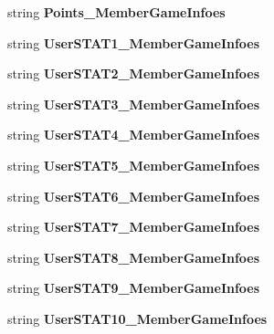 \begin{DoxyCompactItemize}
\item 
string {\bfseries Points\+\_\+\+Member\+Game\+Infoes}\hypertarget{a00102_a4554e189e0fd5b246243ca14fdafbdae}{}\label{a00102_a4554e189e0fd5b246243ca14fdafbdae}

\item 
string {\bfseries User\+S\+T\+A\+T1\+\_\+\+Member\+Game\+Infoes}\hypertarget{a00102_ab75e8a2c3924171fc28d2519b436bde7}{}\label{a00102_ab75e8a2c3924171fc28d2519b436bde7}

\item 
string {\bfseries User\+S\+T\+A\+T2\+\_\+\+Member\+Game\+Infoes}\hypertarget{a00102_afdedc0cfea2563ecc6ddd21f5156947d}{}\label{a00102_afdedc0cfea2563ecc6ddd21f5156947d}

\item 
string {\bfseries User\+S\+T\+A\+T3\+\_\+\+Member\+Game\+Infoes}\hypertarget{a00102_a242d7ea7e8851a32e2a3a9768dfd2ecc}{}\label{a00102_a242d7ea7e8851a32e2a3a9768dfd2ecc}

\item 
string {\bfseries User\+S\+T\+A\+T4\+\_\+\+Member\+Game\+Infoes}\hypertarget{a00102_a2bf47fa75c9ded7b39b5e1947ccbd12a}{}\label{a00102_a2bf47fa75c9ded7b39b5e1947ccbd12a}

\item 
string {\bfseries User\+S\+T\+A\+T5\+\_\+\+Member\+Game\+Infoes}\hypertarget{a00102_afa195a479b8972a4563dc11ac8114ec2}{}\label{a00102_afa195a479b8972a4563dc11ac8114ec2}

\item 
string {\bfseries User\+S\+T\+A\+T6\+\_\+\+Member\+Game\+Infoes}\hypertarget{a00102_aed525a08bec5ac5c27b2cc520c897ed7}{}\label{a00102_aed525a08bec5ac5c27b2cc520c897ed7}

\item 
string {\bfseries User\+S\+T\+A\+T7\+\_\+\+Member\+Game\+Infoes}\hypertarget{a00102_a39fc467613eec00ef0fbe4a77bd83c21}{}\label{a00102_a39fc467613eec00ef0fbe4a77bd83c21}

\item 
string {\bfseries User\+S\+T\+A\+T8\+\_\+\+Member\+Game\+Infoes}\hypertarget{a00102_a672adf9736462b9262af447c76de12bd}{}\label{a00102_a672adf9736462b9262af447c76de12bd}

\item 
string {\bfseries User\+S\+T\+A\+T9\+\_\+\+Member\+Game\+Infoes}\hypertarget{a00102_a29ce173ac8651b12e7c3ea62ae323fa5}{}\label{a00102_a29ce173ac8651b12e7c3ea62ae323fa5}

\item 
string {\bfseries User\+S\+T\+A\+T10\+\_\+\+Member\+Game\+Infoes}\hypertarget{a00102_a60a88df961b6d6d15328cfca7652d5f1}{}\label{a00102_a60a88df961b6d6d15328cfca7652d5f1}


\end{DoxyCompactItemize}
